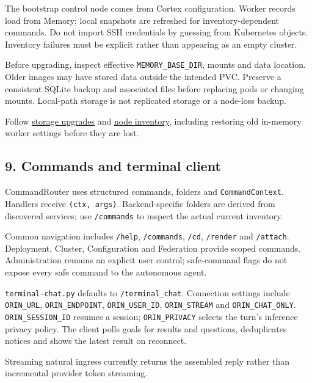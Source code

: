 \documentclass[
  10pt,
]{article}
\begin{document}
The bootstrap control node comes from Cortex configuration. Worker
records load from Memory; local snapshots are refreshed for
inventory-dependent commands. Do not import SSH credentials by guessing
from Kubernetes objects. Inventory failures must be explicit rather than
appearing as an empty cluster.

Before upgrading, inspect effective \texttt{MEMORY\_BASE\_DIR}, mounts
and data location. Older images may have stored data outside the
intended PVC. Preserve a consistent SQLite backup and associated files
before replacing pods or changing mounts. Local-path storage is not
replicated storage or a node-loss backup.

Follow
\href{https://github.com/ILGSupreme/Orin/blob/main/docs/memory-storage-upgrade.md}{storage
upgrades} and
\href{https://github.com/ILGSupreme/Orin/blob/main/docs/node-inventory-api.md}{node
inventory}, including restoring old in-memory worker settings before
they are lost.

\hypertarget{commands-and-terminal-client}{%
\subsection{9. Commands and terminal
client}\label{commands-and-terminal-client}}

CommandRouter uses structured commands, folders and
\texttt{CommandContext}. Handlers receive \texttt{(ctx,\ args)}.
Backend-specific folders are derived from discovered services; use
\texttt{/commands} to inspect the actual current inventory.

Common navigation includes \texttt{/help}, \texttt{/commands},
\texttt{/cd}, \texttt{/render} and \texttt{/attach}. Deployment,
Cluster, Configuration and Federation provide scoped commands.
Administration remains an explicit user control; safe-command flags do
not expose every safe command to the autonomous agent.

\texttt{terminal-chat.py} defaults to \texttt{/terminal\_chat}.
Connection settings include \texttt{ORIN\_URL}, \texttt{ORIN\_ENDPOINT},
\texttt{ORIN\_USER\_ID}, \texttt{ORIN\_STREAM} and
\texttt{ORIN\_CHAT\_ONLY}. \texttt{ORIN\_SESSION\_ID} resumes a session;
\texttt{ORIN\_PRIVACY} selects the turn's inference privacy policy. The
client polls goals for results and questions, deduplicates notices and
shows the latest result on reconnect.

Streaming natural ingress currently returns the assembled reply rather
than incremental provider token streaming.
\end{document}
